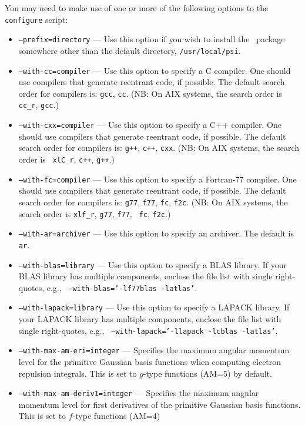 \documentclass[12pt]{article}
\begin{document}
\noindent
You may need to make use of one or more of the following options to
the {\tt configure} script:
\begin{itemize}
\item {\tt --prefix=directory} --- Use this option if you wish to
  install the \PSIthree\ package somewhere other than the default
  directory, {\tt /usr/local/psi}.
\item {\tt --with-cc=compiler} --- Use this option to specify a C
  compiler.  One should use compilers that generate reentrant code,
  if possible. The default search order for compilers is: {\tt gcc},
  {\tt cc}.  (NB: On AIX systems, the search order is {\tt
  cc\_r}, {\tt gcc}.)
\item {\tt --with-cxx=compiler} --- Use this option to specify a C++
  compiler.  One should use compilers that generate reentrant code,
  if possible. The default search order for compilers is: {\tt g++},
  {\tt c++}, {\tt cxx}.  (NB: On AIX systems, the search order is {\tt
  xlC\_r}, {\tt c++}, {\tt g++}.)
\item {\tt --with-fc=compiler} --- Use this option to specify a
  Fortran-77 compiler.  One should use compilers that generate reentrant code,
  if possible. The default search order for compilers is:
  {\tt g77}, {\tt f77}, {\tt fc}, {\tt f2c}.  (NB: On AIX systems, the
  search order is {\tt xlf\_r}, {\tt g77}, {\tt f77}, {\tt
  fc}, {\tt f2c}.)
\item {\tt --with-ar=archiver} --- Use this option to specify an
  archiver.  The default is {\tt ar}.
\item {\tt --with-blas=library} --- Use this option to specify a BLAS
  library.  If your BLAS library has multiple components, enclose the
  file list with single right-quotes, e.g., {\tt
  --with-blas='-lf77blas -latlas'}.
\item {\tt --with-lapack=library} --- Use this option to specify a
  LAPACK library.  If your LAPACK library has multiple components,
  enclose the file list with single right-quotes, e.g., {\tt
  --with-lapack='-llapack -lcblas -latlas'}.
\item {\tt --with-max-am-eri=integer} --- Specifies the maximum
  angular momentum level for the primitive Gaussian basis functions
  when computing electron repulsion integrals.  This is set to
  $g$-type functions (AM=5) by default.
\item {\tt --with-max-am-deriv1=integer} --- Specifies the maximum
  angular momentum level for first derivatives of the primitive
  Gaussian basis functions.  This is set to $f$-type functions (AM=4)

\end{itemize}
\end{document}
